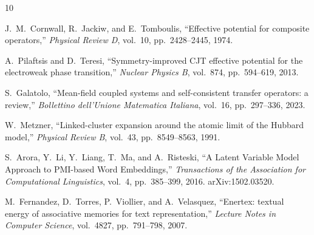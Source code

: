 \documentclass[11pt]{article}
\begin{document}
\begin{thebibliography}{10}

J.~M.~Cornwall, R.~Jackiw, and E.~Tomboulis,
``Effective potential for composite operators,''
\emph{Physical Review D}, vol.~10, pp.~2428--2445, 1974.

A.~Pilaftsis and D.~Teresi,
``Symmetry-improved CJT effective potential for the electroweak phase transition,''
\emph{Nuclear Physics B}, vol.~874, pp.~594--619, 2013.

S.~Galatolo,
``Mean-field coupled systems and self-consistent transfer operators: a review,''
\emph{Bollettino dell'Unione Matematica Italiana}, vol.~16, pp.~297--336, 2023.

W.~Metzner,
``Linked-cluster expansion around the atomic limit of the Hubbard model,''
\emph{Physical Review B}, vol.~43, pp.~8549--8563, 1991.

S.~Arora, Y.~Li, Y.~Liang, T.~Ma, and A.~Risteski,
``A Latent Variable Model Approach to PMI-based Word Embeddings,''
\emph{Transactions of the Association for Computational Linguistics}, vol.~4, pp.~385--399, 2016.
arXiv:1502.03520.

M.~Fernandez, D.~Torres, P.~Viollier, and A.~Velasquez,
``Enertex: textual energy of associative memories for text representation,''
\emph{Lecture Notes in Computer Science}, vol.~4827, pp.~791--798, 2007.

\end{thebibliography}
\end{document}
